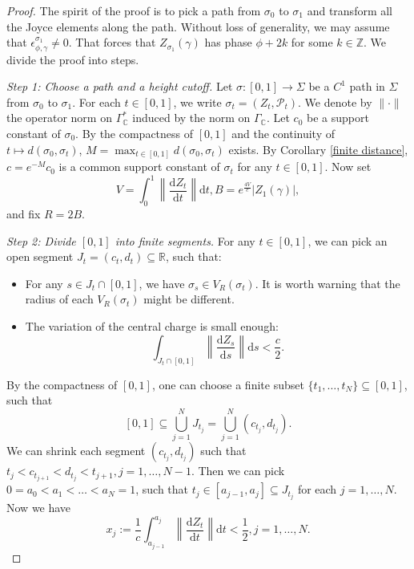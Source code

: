 \documentclass[a4paper,12pt]{amsart}
\numberwithin{equation}{section}
\newcommand{\diff}{\mathrm{d}}
\newcommand{\1}{\mathbf{1}}
\begin{document}
\begin{proof}
    The spirit of the proof is to pick a path from $\sigma_0$ to $\sigma_1$ and transform all the Joyce elements along the path. Without loss of generality, we may assume that $\epsilon^{\sigma_1}_{\phi,\gamma}\neq0$. That forces that $Z_{\sigma_1}(\gamma)$ has phase $\phi+2k$ for some $k\in\mathbb{Z}$. We divide the proof into steps.
    
    \emph{Step 1: Choose a path and a height cutoff.} Let $\sigma:[0,1]\rightarrow\Sigma$ be a $C^1$ path in $\Sigma$ from $\sigma_0$ to $\sigma_1$. For each $t\in[0,1]$, we write $\sigma_t=(Z_t,\mathcal{P}_t)$. We denote by $\|\cdot\|$ the operator norm on $\Gamma_{\mathbb{C}}^*$ induced by the norm on $\Gamma_{\mathbb{C}}$. Let $c_0$ be a support constant of $\sigma_0$. By the compactness of $[0,1]$ and the continuity of $t\mapsto d(\sigma_0,\sigma_t)$, $M=\displaystyle{\max_{t\in[0,1]}d(\sigma_0,\sigma_t)}$ exists. By Corollary \ref{finite distance}, $c=e^{-M}c_0$ is a common support constant of $\sigma_t$ for any $t\in[0,1]$. Now set
    \[V=\int_0^1\left\|\dfrac{\diff Z_t}{\diff t}\right\|\diff t,B=e^{\frac{4V}{c}}|Z_1(\gamma)|,\]
    and fix $R=2B$.

    \emph{Step 2: Divide $[0,1]$ into finite segments.} For any $t\in[0,1]$, we can pick an open segment $J_t=(c_t,d_t)\subseteq\mathbb{R}$, such that:
    \begin{itemize}
        \item For any $s\in J_t\cap[0,1]$, we have $\sigma_s\in V_R(\sigma_t)$. It is worth warning that the radius of each $V_R(\sigma_t)$ might be different.
        \item The variation of the central charge is small enough:
        \[\int_{J_t\cap[0,1]}\left\|\dfrac{\diff Z_s}{\diff s}\right\|\diff s<\dfrac{c}{2}.\]
    \end{itemize}
    By the compactness of $[0,1]$, one can choose a finite subset $\{t_1,\dots,t_N\}\subseteq[0,1]$, such that
    \[[0,1]\subseteq\bigcup_{j=1}^N J_{t_j}=\bigcup_{j=1}^N(c_{t_j},d_{t_j}).\]
    We can shrink each segment $(c_{t_j},d_{t_j})$ such that $t_j<c_{t_{j+1}}<d_{t_j}<t_{j+1},j=1,\dots,N-1$. Then we can pick $0=a_0<a_1<\dots<a_N=1$, such that $t_j\in[a_{j-1},a_j]\subseteq J_{t_j}$ for each $j=1,\dots,N$. Now we have
    \[x_j:=\dfrac{1}{c}\int_{a_{j-1}}^{a_j}\left\|\dfrac{\diff Z_t}{\diff t}\right\|\diff t<\dfrac{1}{2},j=1,\dots,N.\]


\end{proof}
\end{document}
